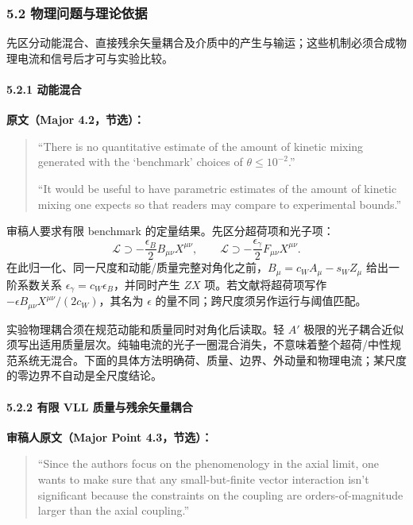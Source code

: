 \documentclass[
  chinese,
  UTF8]{ctexart}
\begin{document}
\subsubsection{5.2 物理问题与理论依据}\label{major-4-step-2}

先区分动能混合、直接残余矢量耦合及介质中的产生与输运；这些机制必须合成物理电流和信号后才可与实验比较。

\paragraph{5.2.1 动能混合}\label{ux52a8ux80fdux6df7ux5408}

\textbf{原文（Major 4.2，节选）：}

\begin{quote}
``There is no quantitative estimate of the amount of kinetic mixing
generated with the `benchmark' choices of \(\theta\leq10^{-2}\).''

``It would be useful to have parametric estimates of the amount of
kinetic mixing one expects so that readers may compare to experimental
bounds.''
\end{quote}

审稿人要求有限 benchmark 的定量结果。先区分超荷项和光子项： \[
\mathcal L\supset-\frac{\epsilon_B}{2}B_{\mu\nu}X^{\mu\nu},
\qquad \mathcal L\supset-\frac{\epsilon_\gamma}{2}F_{\mu\nu}X^{\mu\nu}.
\]
在此归一化、同一尺度和动能/质量完整对角化之前，\(B_\mu=c_WA_\mu-s_WZ_\mu\)
给出一阶系数关系 \(\epsilon_\gamma=c_W\epsilon_B\)，并同时产生 \(ZX\)
项。若文献将超荷项写作 \(-\epsilon B_{\mu\nu}X^{\mu\nu}/(2c_W)\)，其名为
\(\epsilon\) 的量不同；跨尺度须另作运行与阈值匹配。

实验物理耦合须在规范动能和质量同时对角化后读取。轻 \(A'\)
极限的光子耦合近似须写出适用质量层次。纯轴电流的光子一圈混合消失，不意味着整个超荷/中性规范系统无混合。下面的具体方法明确荷、质量、边界、外动量和物理电流；某尺度的零边界不自动是全尺度结论。

\paragraph{5.2.2 有限 VLL
质量与残余矢量耦合}\label{ux6709ux9650-vll-ux8d28ux91cfux4e0eux6b8bux4f59ux77e2ux91cfux8026ux5408}

\textbf{审稿人原文（Major Point 4.3，节选）：}

\begin{quote}
``Since the authors focus on the phenomenology in the axial limit, one
wants to make sure that any small-but-finite vector interaction isn't
significant because the constraints on the coupling are
orders-of-magnitude larger than the axial coupling.''
\end{quote}
\end{document}
